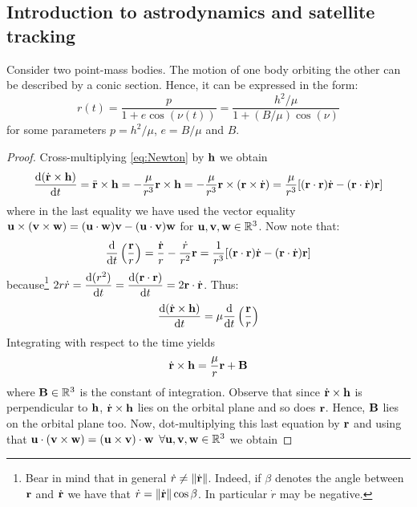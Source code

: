 \documentclass[../main.tex]{subfiles}
\begin{document}
\subsection{Introduction to astrodynamics and satellite tracking}
\begin{proposition}
  \label{prop:two-body}
  Consider two point-mass bodies. The motion of one body orbiting the other can be described by a conic section. Hence, it can be expressed in the form:
  \begin{equation}
    \label{eq:r_conic}
    r(t)=\frac{p}{1+e\cos (\nu(t))}=\frac{h^2/\mu}{1+(B/\mu)\cos(\nu)}
  \end{equation}
  for some parameters $p=h^2/\mu$, $e=B/\mu$ and $B$.
\end{proposition}
\begin{proof}
  Cross-multiplying \cref{eq:Newton} by $\vf{h}$ we obtain
  \begin{equation}
    \dv{(\dot{\vf{r}}\times\vf{h})}{t}=\ddot{\vf{r}}\times\vf{h}=-\frac{\mu}{r^3}\vf{r}\times\vf{h}=-\frac{\mu}{r^3}\vf{r}\times(\vf{r}\times \dot{\vf{r}})=\frac{\mu}{r^3}[(\vf{r}\cdot{\vf{r}})\dot{\vf{r}}-(\vf{r}\cdot\dot{\vf{r}})\vf{r}]
  \end{equation}
  where in the last equality we have used the vector equality $\vf{u}\times(\vf{v}\times\vf{w})=(\vf{u}\cdot\vf{w})\vf{v}-(\vf{u}\cdot\vf{v})\vf{w}$ for $\vf{u}, \vf{v}, \vf{w}\in\RR^3$. Now note that:
  \begin{equation}
    \dv{}{t}\left(\frac{\vf{r}}{r}\right)=\frac{\dot{\vf{r}}}{r}-\frac{\dot{r}}{r^2}\vf{r}= \frac{1}{r^3}[(\vf{r}\cdot{\vf{r}})\dot{\vf{r}}-(\vf{r}\cdot\dot{\vf{r}})\vf{r}]
  \end{equation}
  because\footnote{Bear in mind that in general $\dot{r}\ne\norm{\dot{\vf{r}}}$. Indeed, if $\beta$ denotes the angle between $\vf{r}$ and $\dot{\vf{r}}$ we have that $\dot{r}=\norm{\dot{\vf{r}}}\cos\beta$. In particular $\dot{r}$ may be negative.} $\displaystyle 2r\dot{r}=\dv{(r^2)}{t}=\dv{(\vf{r}\cdot\vf{r})}{t}=2\vf{r}\cdot\dot{\vf{r}}$. Thus:
  \begin{equation}
    \dv{(\dot{\vf{r}}\times\vf{h})}{t}=\mu \dv{}{t}\left(\frac{\vf{r}}{r}\right)
  \end{equation}
  Integrating with respect to the time yields
  \begin{equation}
    \dot{\vf{r}}\times \vf{h}=\frac{\mu}{r}\vf{r}+\vf{B}
  \end{equation}
  where $\vf{B}\in\RR^3$ is the constant of integration. Observe that since $\dot{\vf{r}}\times\vf{h}$ is perpendicular to $\vf{h}$, $\dot{\vf{r}}\times\vf{h}$ lies on the orbital plane and so does $\vf{r}$. Hence, $\vf{B}$ lies on the orbital plane too. Now, dot-multiplying this last equation by $\vf{r}$ and using that $\vf{u}\cdot(\vf{v}\times\vf{w})=(\vf{u}\times\vf{v})\cdot\vf{w}$ $\forall\vf{u},\vf{v},\vf{w}\in\RR^3$ we obtain

\end{proof}
\end{document}
